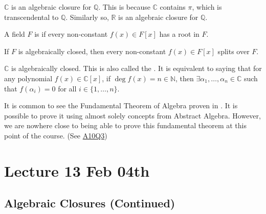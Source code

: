 \documentclass[notoc,notitlepage,nobib]{tufte-book}
\begin{document}
\begin{eg}
  $\mathbb{C}$ is  an algebraic closure for $\mathbb{Q}$. This is
  because $\mathbb{C}$ contains $\pi$, which is transcendental to $\mathbb{Q}$.
  Similarly so, $\mathbb{R}$ is  an algebraic closure for
  $\mathbb{Q}$.
\end{eg}

\begin{defn}\label{defn:algebraically_closed}
  A field $F$ is  if every non-constant $f(x) \in F[x]$
  has a root in $F$.
\end{defn}

\begin{remark}
  If $F$ is algebraically closed, then every non-constant $f(x) \in F[x]$ splits over $F$.
\end{remark}

\begin{eg}\label{eg:fundamental_theorem_of_algebra}
  $\mathbb{C}$ is algebraically closed. This is also called the
  . It is equivalent to saying that for
  any polynomial $f(x) \in \mathbb{C}[x]$, if $\deg f(x) = n \in \mathbb{N}$,
  then $\exists \alpha_1, \ldots, \alpha_n \in \mathbb{C}$ such that
  $f(\alpha_i) = 0$ for all $i \in \{1, \ldots, n\}$.
\end{eg}

\begin{note}
  It is common to see the Fundamental Theorem of Algebra proven in
  . It is possible to prove it using almost solely
  concepts from Abstract Algebra. However, we are nowhere close to being able to
  prove this fundamental theorem at this point of the course. (See
  \hyperref[item:a10q3]{A10Q3})
\end{note}



\chapter{Lecture 13 Feb 04th}%
\label{chp:lecture_13_feb_04th}

\section{Algebraic Closures (Continued)}%
\label{sec:algebraic_closures_continued}
\end{document}
